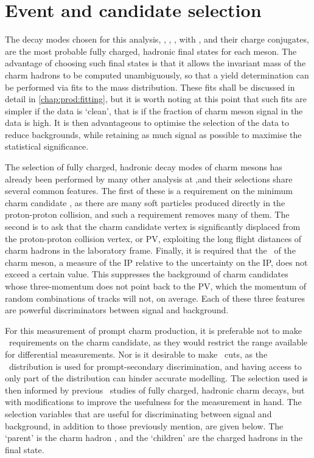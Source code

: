 \chapter{Event and candidate selection}
\label{chap:prod:sel}

The decay modes chosen for this analysis,
\DzToKpi, \DpToKpipi, \DspTophipi, \DstToDzpi with \DzToKpi, and their charge 
conjugates, are the most probable fully charged, hadronic final states for each 
meson.
The advantage of choosing such final states is that it allows the invariant 
mass of the charm hadrons to be computed unambiguously, so that a yield 
determination can be performed via fits to the mass distribution.
These fits shall be discussed in detail in \cref{chap:prod:fitting}, but it is 
worth noting at this point that such fits are simpler if the data is `clean', 
that is if the fraction of charm meson signal in the data is high.
It is then advantageous to optimise the selection of the data to reduce 
backgrounds, while retaining as much signal as possible to maximise the 
statistical significance.

The selection of fully charged, hadronic decay modes of charm mesons has 
already been performed by many other analysis at \lhcb,\footnotemark and their 
selections share several common features.
The first of these is a requirement on the minimum charm candidate \pT, as 
there are many soft particles produced directly in the proton-proton collision, 
and such a requirement removes many of them.
The second is to ask that the charm candidate vertex is significantly displaced 
from the proton-proton collision vertex, or \ac{PV}, exploiting the long flight 
distances of charm hadrons in the laboratory frame.
Finally, it is required that the \ipchisq\ of the charm meson, a measure of the 
\acf{IP} relative to the uncertainty on the \ac{IP}, does not exceed a certain 
value.
This suppresses the background of charm candidates whose three-momentum does 
not point back to the \ac{PV}, which the momentum of random combinations of 
tracks will not, on average.
Each of these three features are powerful discriminators between signal and 
background.

For this measurement of prompt charm production, it is preferable not to make 
\pT\ requirements on the charm candidate, as they would restrict the \pT range 
available for differential measurements.
Nor is it desirable to make \ipchisq\ cuts, as the \ipchisq\ distribution is 
used for prompt-secondary discrimination, and having access to only part of the 
distribution can hinder accurate modelling.
The selection used is then informed by previous \lhcb\ studies of fully 
charged, hadronic charm decays, but with modifications to improve the 
usefulness for the measurement in hand.
The selection variables that are useful for discriminating between signal and 
background, in addition to those previously mention, are given below.
The `parent' is the charm hadron \PHc, and the `children' are the charged 
hadrons in the final state.

